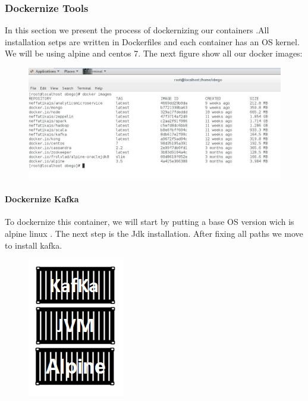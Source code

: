 \subsubsection{Dockernize Tools}
\label{sec:sec01}
In this section we present the process of dockernizing our containers .All installation setps are written 
in Dockerfiles and each container has an OS kernel. We will be using alpine and centos 7.
The next figure show all our docker images:\\
\begin{figure}[h!]
	\centering
	\includegraphics[height=0.3\textheight]{fig01/DockerImages}
	\label{fig:FilialesEtClients}
\end{figure}

\paragraph{Dockernize Kafka}
\label{sec:sec01}
To dockernize this container, we will start by putting a base OS version wich is alpine linux . The next step is the Jdk installation. After fixing all paths we move to install
kafka.
\begin{figure}[h!]
	\centering
	\includegraphics[height=0.2\textheight]{fig01/KafkaContainer}
	\label{fig:FilialesEtClients}
\end{figure}
